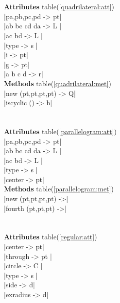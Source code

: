 \documentclass[DIV         = 14,
               fontsize    = 10,
               index       = totoc,
               twoside,
               cadre,
               headings    = small
               ]{tkz-doc}
\begin{document}
\begin{multicols}{3}
                                   \\
     \\
 \textbf{Attributes} table(\ref{quadrilateral:att}) \\
|pa,pb,pc,pd               -> pt|  \\
|ab bc cd da               -> L |  \\
|ac bd                     -> L |  \\
|type                      -> s |  \\
|i                         -> pt|  \\
|g                         -> pt|  \\
|a b c d                   -> r|   \\
 \textbf{Methods} table(\ref{quadrilateral:met}) \\
|new (pt,pt,pt,pt)         -> Q|   \\ 
|iscyclic ()               -> b|   \\         
                                   \\
      \\
 \textbf{Attributes} table(\ref{parallelogram:att}) \\
|pa,pb,pc,pd               -> pt|  \\
|ab bc cd da               -> L |  \\
|ac bd                     -> L |  \\
|type                      -> s |  \\
|center                    -> pt|  \\
 \textbf{Methods} table(\ref{parallelogram:met}) \\
|new (pt,pt,pt,pt)         ->|     \\ 
|fourth (pt,pt,pt)         ->|     \\
                                   \\
   \\
 \textbf{Attributes} table(\ref{regular:att}) \\
|center                    -> pt|  \\
|through                   -> pt | \\
|circle                    -> C |  \\
|type                      -> s |  \\
|side                      -> d|   \\
|exradius                  -> d|   \\

\end{multicols}
\end{document}
